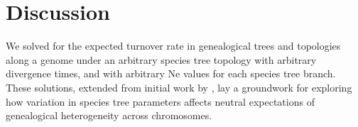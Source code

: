 \documentclass[11pt]{article}
\begin{document}


\section{Discussion}



We solved for the expected turnover rate in genealogical trees and topologies 
along a genome under an arbitrary species tree topology with arbitrary 
divergence times, and with arbitrary Ne values for each species tree branch.
These solutions, extended from initial work by \citep{deng_distribution_2021}, 
lay a groundwork for exploring how variation in species tree parameters 
affects neutral expectations of genealogical heterogeneity across chromosomes.
\end{document}
